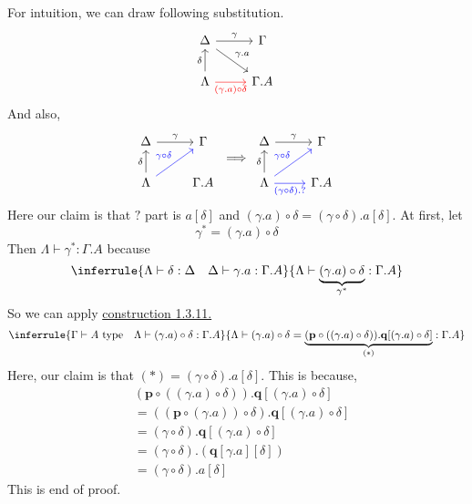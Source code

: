 \documentclass[12pt, a4paper, openany, twoside]{book}
\theoremstyle{definition}
\theoremstyle{remark}
\theoremstyle{plain}
\numberwithin{equation}{section}
\begin{document}
\begin{tcolorbox}[colback=yellow!10!white,colframe=brown!75!black,title=Exercise 2.2]
    For intuition, we can draw following substitution. 
    \[
    \begin{tikzcd}
        \Delta \arrow[r, "\gamma"] \arrow[rd, "\gamma.a"] & \Gamma \\
        \Lambda \arrow[u, "\delta"] \arrow[r, "(\gamma.a)\circ \delta"', red] & \Gamma.A
    \end{tikzcd}
    \]
    And also, 
    \[
    \begin{tikzcd}
        \Delta \arrow[r, "\gamma"]  & \Gamma \\
        \Lambda \arrow[u, "\delta"] \arrow[ru, "\gamma \circ \delta", blue] & \Gamma.A
    \end{tikzcd}
    \implies 
    \begin{tikzcd}
        \Delta \arrow[r, "\gamma"]  & \Gamma \\
        \Lambda \arrow[u, "\delta"] \arrow[ru, "\gamma \circ \delta", blue] \arrow[r, "(\gamma \circ \delta).?"', blue] & \Gamma.A
    \end{tikzcd}
    \]
    Here our claim is that $?$ part is $a[\delta]$ and $(\gamma.a)\circ \delta = (\gamma \circ \delta).a[\delta]$. 
    At first, let 
    \[\gamma^* = (\gamma.a) \circ \delta\]
    Then $\Lambda \vdash \gamma^* : \Gamma.A$ because 
    \[
    \inferrule
    {\Lambda \vdash \delta : \Delta \quad \Delta \vdash \gamma.a : \Gamma.A}
    {\Lambda \vdash \underbrace{(\gamma.a) \circ \delta}_{\gamma^*} : \Gamma.A}
    \]
    So we can apply \hyperlink{construction 1.3.11}{construction 1.3.11.}
    \[
    \inferrule
    {\Gamma \vdash A \text{ type} \quad \Lambda \vdash (\gamma.a) \circ \delta : \Gamma.A}
    {\Lambda \vdash (\gamma.a) \circ \delta = \underbrace{(\mathbf{p} \circ ((\gamma.a) \circ \delta)).\mathbf{q}[(\gamma.a)\circ \delta]}_{(*)} : \Gamma.A}
    \]
    Here, our claim is that $(*) = (\gamma \circ \delta).a[\delta]$. This is because, 
    \begin{align*}
        & (\mathbf{p} \circ ((\gamma.a) \circ \delta)).\mathbf{q}[(\gamma.a)\circ \delta] \\
        & = ((\mathbf{p} \circ (\gamma.a)) \circ \delta).\mathbf{q}[(\gamma.a)\circ \delta] \\
        & = (\gamma \circ \delta).\mathbf{q}[(\gamma.a)\circ \delta] \\
        & = (\gamma \circ \delta).(\mathbf{q}[\gamma.a][\delta]) \\
        & = (\gamma \circ \delta).a[\delta]
    \end{align*}
    This is end of proof. 
\end{tcolorbox}
\end{document}
